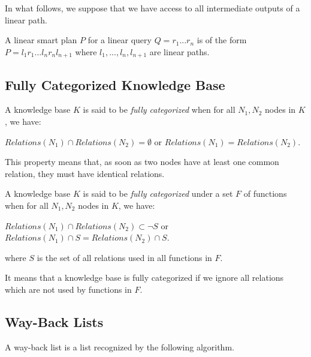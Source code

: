 \documentclass[10pt,a4paper,draft]{article}
\begin{document}
In what follows, we suppose that we have access to all intermediate outputs of a linear path.

\begin{property}
A linear smart plan $P$ for a linear query $Q = r_1 ... r_n$ is of the form $P = l_1 r_1 ... l_n r_n l_{n+1}$ where $l_1,..., l_n, l_{n+1}$ are linear paths.
\end{property}

\subsection{Fully Categorized Knowledge Base}

\begin{definition}
A knowledge base $K$ is said to be \textit{fully categorized} when for all $N_1, N_2$ nodes in $K$, we have:\\
\begin{center}
$Relations(N_1) \cap Relations(N_2) = \emptyset$ or $Relations(N_1) = Relations(N_2)$.
\end{center}
\end{definition}

This property means that, as soon as two nodes have at least one common relation, they must have identical relations.

\begin{definition}
A knowledge base $K$ is said to be \textit{fully categorized} under a set $F$ of functions when for all $N_1, N_2$ nodes in $K$, we have:\\
\begin{center}
$Relations(N_1) \cap Relations(N_2) \subset \neg S$ or $Relations(N_1) \cap S = Relations(N_2) \cap S$.
\end{center}
where $S$ is the set of all relations used in all functions in $F$.
\end{definition}

It means that a knowledge base is fully categorized if we ignore all relations which are not used by functions in $F$.

\subsection{Way-Back Lists}

\begin{definition}
\label{Way-Back List 1}
A way-back list is a list recognized by the following algorithm.
\end{definition}
\end{document}
